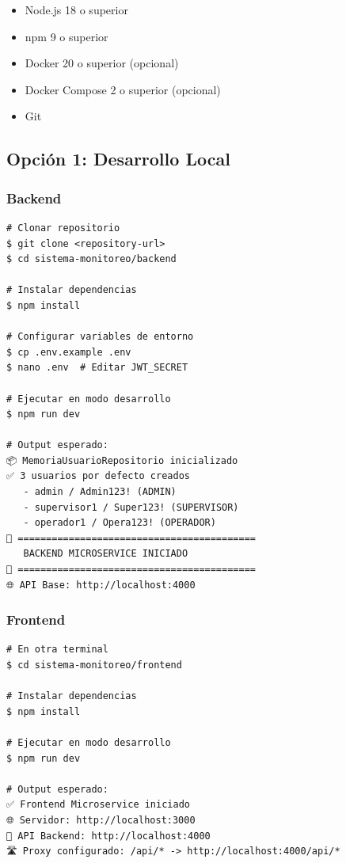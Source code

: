 \documentclass[12pt,a4paper]{article}
\begin{document}
\begin{itemize}[leftmargin=*]
    \item Node.js 18 o superior
    \item npm 9 o superior
    \item Docker 20 o superior (opcional)
    \item Docker Compose 2 o superior (opcional)
    \item Git
\end{itemize}

\subsection{Opción 1: Desarrollo Local}

\subsubsection{Backend}

\begin{verbatim}
# Clonar repositorio
$ git clone <repository-url>
$ cd sistema-monitoreo/backend

# Instalar dependencias
$ npm install

# Configurar variables de entorno
$ cp .env.example .env
$ nano .env  # Editar JWT_SECRET

# Ejecutar en modo desarrollo
$ npm run dev

# Output esperado:
📦 MemoriaUsuarioRepositorio inicializado
✅ 3 usuarios por defecto creados
   - admin / Admin123! (ADMIN)
   - supervisor1 / Super123! (SUPERVISOR)
   - operador1 / Opera123! (OPERADOR)
🔧 ==========================================
   BACKEND MICROSERVICE INICIADO
🔧 ==========================================
🌐 API Base: http://localhost:4000
\end{verbatim}

\subsubsection{Frontend}

\begin{verbatim}
# En otra terminal
$ cd sistema-monitoreo/frontend

# Instalar dependencias
$ npm install

# Ejecutar en modo desarrollo
$ npm run dev

# Output esperado:
✅ Frontend Microservice iniciado
🌐 Servidor: http://localhost:3000
🔗 API Backend: http://localhost:4000
🛣️ Proxy configurado: /api/* -> http://localhost:4000/api/*
\end{verbatim}
\end{document}
